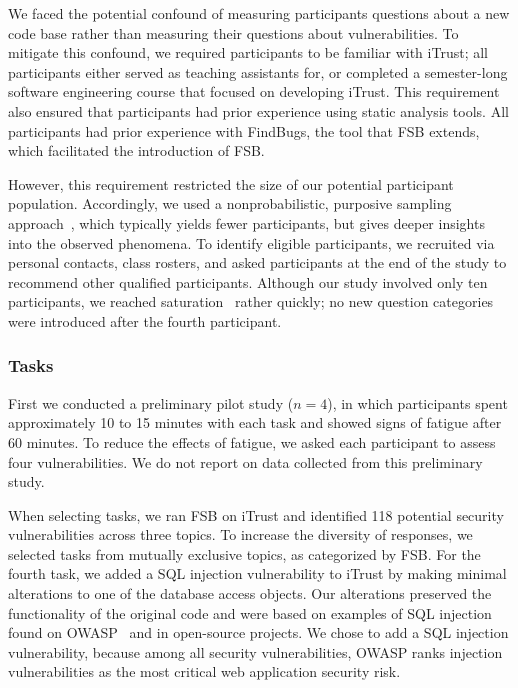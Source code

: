 \documentclass[10pt,journal,compsoc]{IEEEtran}
\begin{document}
We faced the potential confound of measuring participants questions about a new code base rather than measuring their questions about vulnerabilities.
To mitigate this confound, we required participants to be familiar with iTrust;
all participants either served as teaching assistants for, or completed a semester-long software engineering course that focused on developing iTrust.
This requirement also ensured that participants had prior experience using static analysis tools.
All participants had prior experience with FindBugs, the tool that FSB extends, which facilitated the introduction of FSB.

However, this requirement restricted the size of our potential participant population.
Accordingly, we used a nonprobabilistic, purposive sampling approach~\cite{guest2006many}, which typically yields fewer participants, but gives deeper insights into the observed phenomena.
To identify eligible participants, we recruited via personal contacts, class rosters, and asked participants at the end of the study to recommend other qualified participants.
Although our study involved only ten participants, we reached saturation~\cite{glaser2009discovery} rather quickly; 
no new question categories were introduced after the fourth participant.

%



  
\subsubsection{Tasks}
First we conducted a preliminary pilot study ($n = 4$), in which  participants spent approximately 10 to 15 minutes with each task and showed signs of fatigue after 60 minutes.
To reduce the effects of fatigue, we asked each participant to assess four vulnerabilities. 
We do not report on data collected from this preliminary study.

When selecting tasks, we ran FSB on iTrust and identified 118 potential security vulnerabilities across three topics.
To increase the diversity of responses, we selected tasks from mutually exclusive topics, as categorized by FSB.
For the fourth task, we added a SQL injection vulnerability to iTrust by making minimal alterations to one of the database access objects.
Our alterations preserved the functionality of the original code and were based on examples of SQL injection found on OWASP~\cite{OWASP} and in open-source projects.
We chose to add a SQL injection vulnerability, because among all security vulnerabilities, OWASP ranks injection vulnerabilities as the most critical web application security risk.
\end{document}
